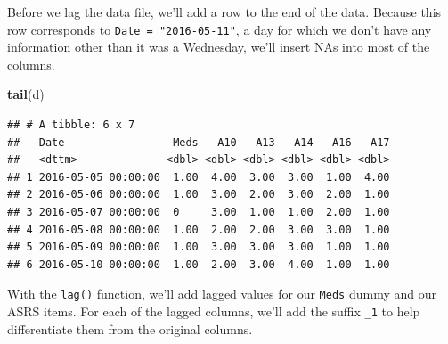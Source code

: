 \documentclass[]{article}
\newenvironment{Shaded}{\begin{snugshade}}{\end{snugshade}}
\newcommand{\KeywordTok}[1]{\textcolor[rgb]{0.13,0.29,0.53}{\textbf{#1}}}
\newcommand{\DataTypeTok}[1]{\textcolor[rgb]{0.13,0.29,0.53}{#1}}
\newcommand{\StringTok}[1]{\textcolor[rgb]{0.31,0.60,0.02}{#1}}
\newcommand{\OtherTok}[1]{\textcolor[rgb]{0.56,0.35,0.01}{#1}}
\newcommand{\OperatorTok}[1]{\textcolor[rgb]{0.81,0.36,0.00}{\textbf{#1}}}
\newcommand{\NormalTok}[1]{#1}
\begin{document}
Before we lag the data file, we'll add a row to the end of the data.
Because this row corresponds to \texttt{Date\ =\ "2016-05-11"}, a day
for which we don't have any information other than it was a Wednesday,
we'll insert NAs into most of the columns.

\begin{Shaded}
\begin{Highlighting}[]
\KeywordTok{tail}\NormalTok{(d)}
\end{Highlighting}
\end{Shaded}

\begin{verbatim}
## # A tibble: 6 x 7
##   Date                 Meds   A10   A13   A14   A16   A17
##   <dttm>              <dbl> <dbl> <dbl> <dbl> <dbl> <dbl>
## 1 2016-05-05 00:00:00  1.00  4.00  3.00  3.00  1.00  4.00
## 2 2016-05-06 00:00:00  1.00  3.00  2.00  3.00  2.00  1.00
## 3 2016-05-07 00:00:00  0     3.00  1.00  1.00  2.00  1.00
## 4 2016-05-08 00:00:00  1.00  2.00  2.00  3.00  3.00  1.00
## 5 2016-05-09 00:00:00  1.00  3.00  3.00  3.00  1.00  1.00
## 6 2016-05-10 00:00:00  1.00  2.00  3.00  4.00  1.00  1.00
\end{verbatim}

\begin{Shaded}
\end{Shaded}

With the \texttt{lag()} function, we'll add lagged values for our
\texttt{Meds} dummy and our ASRS items. For each of the lagged columns,
we'll add the suffix \texttt{\_1} to help differentiate them from the
original columns.

\begin{Shaded}
\end{Shaded}
\end{document}
